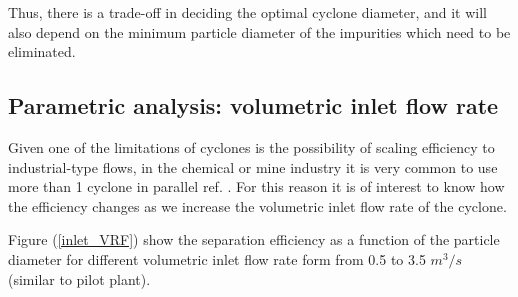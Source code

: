 Thus, there is a trade-off in deciding the optimal cyclone diameter, and it will also depend on the minimum particle diameter of the impurities which need to be eliminated.
\subsection{Parametric analysis: volumetric inlet flow rate}
Given one of the limitations of cyclones is the possibility of scaling efficiency to industrial-type flows, in the chemical or mine industry it is very common to use more than 1 cyclone in parallel ref. \cite{Concha2007}. For this reason it is of interest to know how the efficiency changes as we increase the volumetric inlet flow rate of the cyclone.

Figure (\ref{inlet_VRF}) show the separation efficiency as a function of the particle diameter for different volumetric inlet flow rate form from 0.5 to 3.5 $m^3/s$ (similar to pilot plant). 

